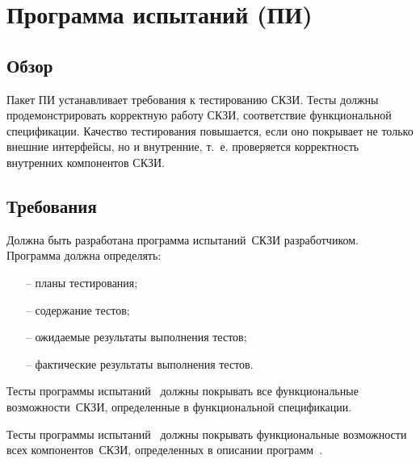 \section{Программа испытаний (ПИ)}\label{TE}

\subsection{Обзор}\label{TE.Intro}

Пакет ПИ устанавливает требования к тестированию СКЗИ.
%
Тесты должны продемонстрировать корректную работу СКЗИ, 
соответствие функциональной спецификации.
%
Качество тестирования повышается, если оно покрывает не только внешние 
интерфейсы, но и внутренние, т.~е. проверяется корректность 
внутренних компонентов СКЗИ.

\subsection{Требования}\label{TE.Reqs}

\label{R.TE.Prg}
Должна быть разработана программа испытаний~СКЗИ разработчиком.
Программа должна определять:
\begin{itemize}
\item[--]
планы тестирования;
\item[--]
содержание тестов;
\item[--]
ожидаемые результаты выполнения тестов;
\item[--]
фактические результаты выполнения тестов.
\end{itemize}

\label{R.TE.Coverage}
Тесты программы испытаний~ должны 
покрывать все функциональные возможности~СКЗИ, 
определенные в функциональной спецификации.

\label{R.TE.Deep}
Тесты программы испытаний~ должны 
покрывать функциональные возможности всех компонентов~СКЗИ, 
определенных в описании программ~.

